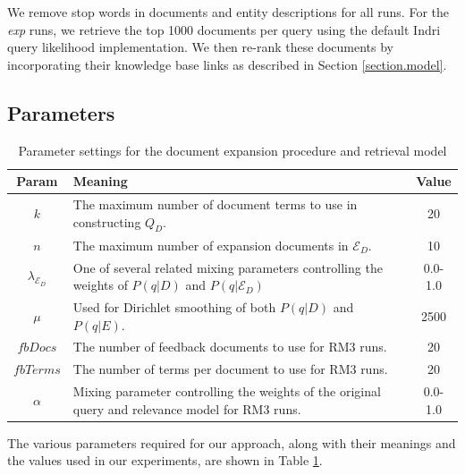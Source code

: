 \documentclass{report}
\begin{document}
We remove stop words in documents and entity descriptions for all runs. For the \textit{exp} runs, we retrieve the top 1000 documents per query using the default Indri query likelihood implementation. We then re-rank these documents by incorporating their knowledge base links as described in Section \ref{section.model}.

\subsection{Parameters}\label{section.evaluation.parameters}

\begin{table}[htb]
\centering
\begin{tabular}{|c|p{}|c|} \hline
{\bf Param} & {\bf Meaning} & {\bf Value} \\ \hline
$k$ & The maximum number of document terms to use in constructing $Q_D$. & 20 \\ \hline
$n$ & The maximum number of expansion documents in $\mathcal{E}_D$. & 10 \\ \hline
$\lambda_{\mathcal{E}_D}$ & One of several related mixing parameters controlling the weights of $P(q|D)$ and $P(q|\mathcal{E}_D)$ & 0.0-1.0 \\ \hline
$\mu$ & Used for Dirichlet smoothing of both $P(q|D)$ and $P(q|E)$. & 2500 \\ \hline
$fbDocs$ & The number of feedback documents to use for RM3 runs. & 20 \\ \hline
$fbTerms$ & The number of terms per document to use for RM3 runs. & 20 \\ \hline
$\alpha$ & Mixing parameter controlling the weights of the original query and relevance model for RM3 runs. & 0.0-1.0 \\ \hline
\end{tabular}
\caption{Parameter settings for the document expansion procedure and retrieval model}
\label{table.parameters}
\end{table}

The various parameters required for our approach, along with their meanings and the values used in our experiments, are shown in Table \ref{table.parameters}. 

\end{document}

